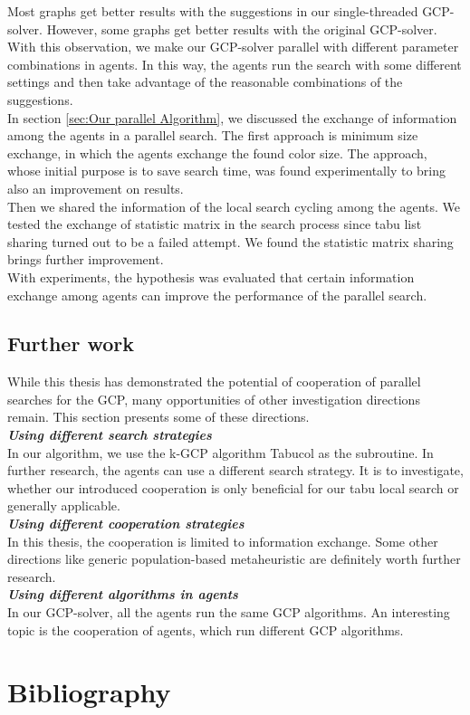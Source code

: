 \documentclass[12pt,a4paper,twoside]{scrartcl}
\numberwithin{equation}{section}
\begin{document}
Most graphs get better results with the suggestions in our single-threaded GCP-solver. However, some graphs get better results with the original GCP-solver. With this observation, we make our GCP-solver parallel with different parameter combinations in agents. In this way, the agents run the search with some different settings and then take advantage of the reasonable combinations of the suggestions.\\

In section \ref{sec:Our parallel Algorithm}, we discussed the exchange of information among the agents in a parallel search. The first approach is minimum size exchange, in which the agents exchange the found color size. The approach, whose initial purpose is to save search time, was found experimentally to bring also an improvement on results.\\
Then we shared the information of the local search cycling among the agents. We tested the exchange of statistic matrix in the search process since tabu list sharing turned out to be a failed attempt. We found the statistic matrix sharing brings further improvement.\\

With experiments, the hypothesis was evaluated that certain information exchange among agents can improve the performance of the parallel search. 
\subsection{Further work}
While this thesis has demonstrated the potential of cooperation of parallel searches for the GCP, many opportunities of other investigation directions remain. This section presents some of these directions.\\

\emph{\textbf{Using different  search strategies}}\\
In our algorithm, we use the k-GCP algorithm Tabucol as the subroutine. In further research, the agents can use a different search strategy. It is to investigate, whether our introduced cooperation is only beneficial for our tabu local search or generally applicable.\\

\emph{\textbf{Using different cooperation strategies}}\\
In this thesis, the cooperation is limited to information exchange. Some other directions like generic population-based metaheuristic are definitely worth further research.\\

\emph{\textbf{Using different algorithms in agents}}\\
In our GCP-solver, all the agents run the same GCP algorithms. An interesting topic is the cooperation of agents, which run different GCP algorithms.
\clearpage
\section{Bibliography}


\end{document}
